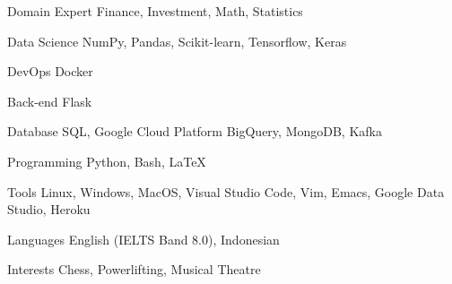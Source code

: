 

\begin{cvskills}

  \cvskill
    {Domain Expert} %
    {Finance, Investment, Math, Statistics} %

  \cvskill
    {Data Science} %
    {NumPy, Pandas, Scikit-learn, Tensorflow, Keras} %

  \cvskill
    {DevOps} %
    {Docker} %

  \cvskill
    {Back-end} %
    {Flask} %

  \cvskill
    {Database} %
    {SQL, Google Cloud Platform BigQuery, MongoDB, Kafka} %

  \cvskill
    {Programming} %
    {Python, Bash, LaTeX} %

  \cvskill
    {Tools} %
    {Linux, Windows, MacOS, Visual Studio Code, Vim, Emacs, Google Data Studio, Heroku} %

  \cvskill
    {Languages} %
    {English (IELTS Band 8.0), Indonesian} %

  \cvskill
    {Interests} %
    {Chess, Powerlifting, Musical Theatre} %

\end{cvskills}
